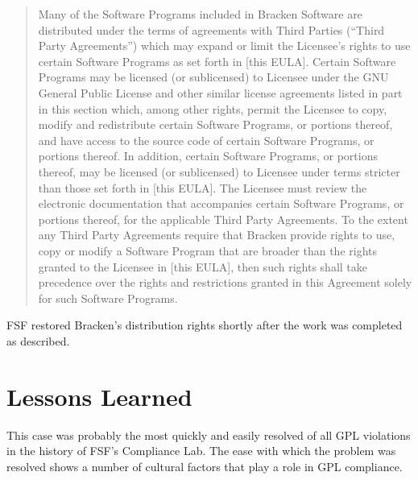 \begin{quotation}
Many of the Software Programs included in Bracken Software are distributed
under the terms of agreements with Third Parties (``Third Party
Agreements'') which may expand or limit the Licensee's rights to use
certain Software Programs as set forth in [this EULA]. Certain Software
Programs may be licensed (or sublicensed) to Licensee under the GNU
General Public License and other similar license agreements listed in part
in this section which, among other rights, permit the Licensee to copy,
modify and redistribute certain Software Programs, or portions thereof,
and have access to the source code of certain Software Programs, or
portions thereof. In addition, certain Software Programs, or portions
thereof, may be licensed (or sublicensed) to Licensee under terms stricter
than those set forth in [this EULA]. The Licensee must review the
electronic documentation that accompanies certain Software Programs, or
portions thereof, for the applicable Third Party Agreements. To the
extent any Third Party Agreements require that Bracken provide rights to
use, copy or modify a Software Program that are broader than the rights
granted to the Licensee in [this EULA], then such rights shall take
precedence over the rights and restrictions granted in this Agreement
solely for such Software Programs.
\end{quotation}

FSF restored Bracken's distribution rights shortly after the work was
completed as described.

\section{Lessons Learned}

This case was probably the most quickly and easily resolved of all GPL
violations in the history of FSF's Compliance Lab. The ease with which
the problem was resolved shows a number of cultural factors that play a
role in GPL compliance.

